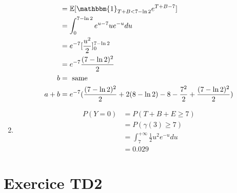 \documentclass{article}
\theoremstyle{plain}%
\theoremstyle{definition}
\theoremstyle{remark}
\begin{document}
\begin{enumerate}
\begin{align*}
        &= \mathbb{E} [ \mathbbm{1}_{T +B < 7 - \ln 2} e^{T + B - 7}] \\ 
        &= \int_{0}^{7 - \ln 2}e^{u - 7 } u e^{-u} du \\
        &= e^{-7} [ \frac{u^2}{2}]^{7 - \ln 2}_{0} \\
        &= e^{-7} \frac{(7 - \ln 2)^2}{2} \\
        b &= \text{ same }\\
        a + b &= e^{-7} ( \frac{(7 - \ln 2)^2}{2} + 2 ( 8 - \ln 2) - 8 - \frac{7^2}{2} + \frac{(7 - \ln 2)^2}{2})
    \end{align*}
    \item \begin{align*}
        P(Y = 0) &= P(T+B+E \geq 7) \\
            &= P(\gamma (3) \geq 7) \\
            &= \int_{7}^{+\infty } \frac{1}{2} u^2 e^{-u}du \\
            &= 0.029
    \end{align*}
\end{enumerate}

\section{Exercice TD2}
\end{document}
